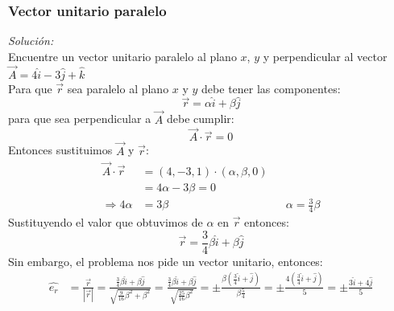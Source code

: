 \documentclass[12pt,openany]{book}
\begin{document}
			\subsubsection{Vector unitario paralelo}
				\noindent\textsl{Soluci\'on:}\\
				Encuentre un vector unitario paralelo al plano $x$, $y$ y perpendicular al vector
				$\vec{A}=4\hat{i}-3\hat{j}+\hat{k}$ \\
				Para que $\vec{r}$ sea paralelo al plano $x$ y $y$ debe tener las componentes:
				$$
					\vec{r}=\alpha\hat{i}+\beta\hat{j}
				$$
				\noindentAhora para que sea perpendicular a $\vec{A}$ debe cumplir:
				$$
					\vec{A}\cdot\vec{r}=0
				$$
				\noindent Entonces sustituimos $\vec{A}$ y $\vec{r}$:
				\begin{equation*}
					\begin{split}
						\vec{A}\cdot\vec{r}&=(4,-3,1)\cdot(\alpha,\beta,0)\\
											&=4\alpha-3\beta=0\\
						\Rightarrow 4\alpha&=3\beta&
									&\alpha=\frac{3}{4}\beta
					\end{split}
				\end{equation*}
				Sustituyendo el valor que obtuvimos de $\alpha$ en $\vec{r}$ entonces:
				$$
					\vec{r}=\frac{3}{4}\beta\hat{i}+\beta\hat{j}
				$$
				Sin embargo, el problema nos pide un vector unitario, entonces:
				\begin{equation*}
					\begin{split}	
						\hat{e_{r}}&=\frac{\vec{r}}{|\vec{r}|}=\frac{\frac{3}{4}\beta\hat{i}+\beta\hat{j}}
																	{\sqrt{\frac{9}{16}\beta^{2}+\beta^{2}}}
									=\frac{\frac{3}{4}\beta\hat{i}+\beta\hat{j}}{\sqrt{\frac{25}{16}\beta^{2}}}
									=\pm\frac{\beta(\frac{3}{4}\hat{i}+\hat{j})}{\beta\frac{5}{4}}
									=\pm\frac{4(\frac{3}{4}\hat{i}+\hat{j})}{5}
									=\pm\frac{3\hat{i}+4\hat{j}}{5}
					\end{split}
				\end{equation*}

\end{document}
